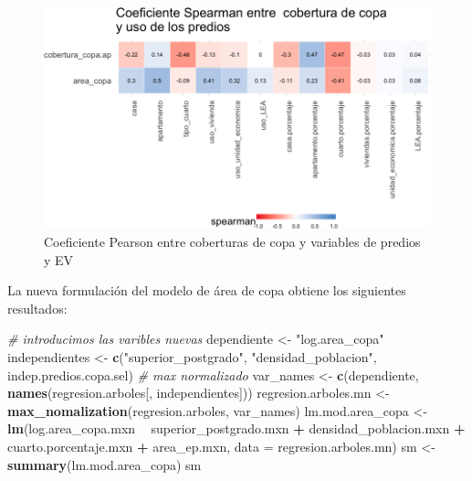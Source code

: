 \documentclass[12pt,]{book}
\newenvironment{Shaded}{\begin{snugshade}}{\end{snugshade}}
\newcommand{\KeywordTok}[1]{\textcolor[rgb]{0.13,0.29,0.53}{\textbf{#1}}}
\newcommand{\DataTypeTok}[1]{\textcolor[rgb]{0.13,0.29,0.53}{#1}}
\newcommand{\StringTok}[1]{\textcolor[rgb]{0.31,0.60,0.02}{#1}}
\newcommand{\CommentTok}[1]{\textcolor[rgb]{0.56,0.35,0.01}{\textit{#1}}}
\newcommand{\OperatorTok}[1]{\textcolor[rgb]{0.81,0.36,0.00}{\textbf{#1}}}
\newcommand{\NormalTok}[1]{#1}
\begin{document}
\begin{figure}
\includegraphics[width=1\linewidth]{tesis-unigis_files/figure-latex/tile-copa-prediosev-spearman-1} \caption{Coeficiente Pearson entre coberturas de copa y variables de predios y EV}\label{fig:tile-copa-prediosev-spearman}
\end{figure}

La nueva formulación del modelo de área de copa obtiene los siguientes
resultados:

\begin{Shaded}
\begin{Highlighting}[]
\CommentTok{# introducimos las varibles nuevas}
\NormalTok{dependiente <-}\StringTok{ "log.area_copa"}
\NormalTok{independientes <-}\StringTok{ }\KeywordTok{c}\NormalTok{(}\StringTok{"superior_postgrado"}\NormalTok{, }\StringTok{"densidad_poblacion"}\NormalTok{, indep.predios.copa.sel)}
\CommentTok{# max normalizado}
\NormalTok{var_names <-}\StringTok{ }\KeywordTok{c}\NormalTok{(dependiente, }\KeywordTok{names}\NormalTok{(regresion.arboles[, independientes]))}
\NormalTok{regresion.arboles.mn <-}\StringTok{ }\KeywordTok{max_nomalization}\NormalTok{(regresion.arboles, var_names)}
\NormalTok{lm.mod.area_copa <-}\StringTok{ }\KeywordTok{lm}\NormalTok{(log.area_copa.mxn }\OperatorTok{~}\StringTok{ }\NormalTok{superior_postgrado.mxn }\OperatorTok{+}\StringTok{ }\NormalTok{densidad_poblacion.mxn }\OperatorTok{+}\StringTok{ }
\StringTok{    }\NormalTok{cuarto.porcentaje.mxn }\OperatorTok{+}\StringTok{ }\NormalTok{area_ep.mxn, }\DataTypeTok{data =}\NormalTok{ regresion.arboles.mn)}
\NormalTok{sm <-}\StringTok{ }\KeywordTok{summary}\NormalTok{(lm.mod.area_copa)}
\NormalTok{sm}
\end{Highlighting}
\end{Shaded}
\end{document}
